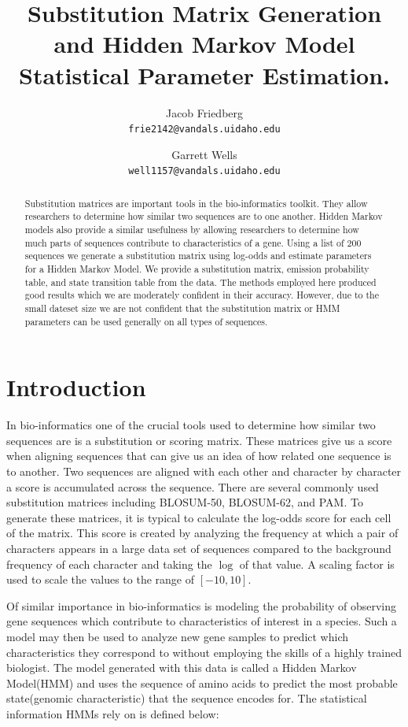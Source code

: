 \documentclass[a4paper,11pt]{article}
\title{Substitution Matrix Generation and Hidden Markov Model Statistical Parameter Estimation.}
\author{
Jacob Friedberg \\
\texttt{frie2142@vandals.uidaho.edu}
\and
Garrett Wells \\
\texttt{well1157@vandals.uidaho.edu}
}
\begin{document}
\maketitle
\begin{abstract}
    \noindent Substitution matrices are important tools in the bio-informatics toolkit. They allow researchers to determine how similar two sequences are to one another. Hidden Markov models also provide a similar usefulness by allowing researchers to determine how much parts of sequences contribute to characteristics of a gene. Using a list of 200 sequences we generate a substitution matrix using log-odds and estimate parameters for a Hidden Markov Model. We provide a substitution matrix, emission probability table, and state transition table from the data. The methods employed here produced good results which we are moderately confident in their accuracy. However, due to the small dateset size we are not confident that the substitution matrix or HMM parameters can be used generally on all types of sequences.
\end{abstract}

\section{Introduction}

In bio-informatics one of the crucial tools used to determine how similar two sequences are is a substitution or scoring matrix. These matrices give us a score when aligning sequences that can give us an idea of how related one sequence is to another. Two sequences are aligned with each other and character by character a score is accumulated across the sequence. There are several commonly used substitution matrices including BLOSUM-50, BLOSUM-62, and PAM. To generate these matrices, it is typical to calculate the log-odds score for each cell of the matrix. This score is created by analyzing the frequency at which a pair of characters appears in a large data set of sequences compared to the background frequency of each character and taking the $\log$ of that value. A scaling factor is used to scale the values to the range of $[-10,10]$. 


Of similar importance in bio-informatics is modeling the probability of observing gene sequences which contribute to characteristics of interest in a species. Such a model may then be used to analyze new gene samples to predict which characteristics they correspond to without employing the skills of a highly trained biologist. The model generated with this data is called a Hidden Markov Model(HMM) and uses the sequence of amino acids to predict the most probable state(genomic characteristic) that the sequence encodes for. The statistical information HMMs rely on is defined below:
\end{document}
